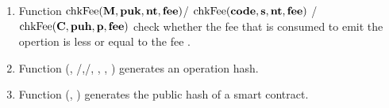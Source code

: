 \documentclass[a4paper]{llncs}
\begin{document}
\begin{enumerate}
    \item Function  $\textup{chkFee} (\textbf{M}, \textbf{puk},\textbf{nt}, \textbf{fee})$/ $\textup{chkFee} (\textbf{code}, \textbf{s}, \textbf{nt}, \textbf{fee})$ / $\textup{chkFee} (\textbf{C}, \textbf{puh}, \textbf{p}, \textbf{fee})$ check whether the fee that is consumed to emit the opertion is less or equal to the fee \MTEZ. 
    \item Function \GENERATEOPH (\PUK, {\ADDR /\CODE},{\INIT /\PARAMETER}, \NTEZ, \MTEZ,  \TIME) generates an operation hash.

    \item Function \GENERATEHASH (\CODE, \TIME)  generates the public hash of a smart contract.
     
   
\end{enumerate}
\end{document}

